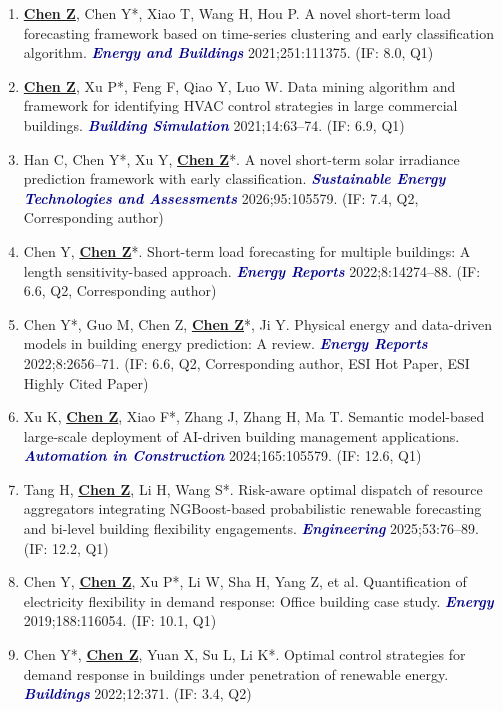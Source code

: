 \documentclass[11pt,a4paper]{article}
\newcommand{\me}[1]{\underline{\textbf{#1}}}
\newcommand{\journal}[1]{\textcolor{darkblue}{\textbf{\textit{#1}}}}
\begin{document}
\begin{enumerate}[itemsep=1pt]
\item \me{Chen Z}, Chen Y*, Xiao T, Wang H, Hou P. A novel short-term load forecasting framework based on time-series clustering and early classification algorithm. \journal{Energy and Buildings} 2021;251:111375. (IF: 8.0, Q1)

\item \me{Chen Z}, Xu P*, Feng F, Qiao Y, Luo W. Data mining algorithm and framework for identifying HVAC control strategies in large commercial buildings. \journal{Building Simulation} 2021;14:63--74. (IF: 6.9, Q1)

\item Han C, Chen Y*, Xu Y, \me{Chen Z}*. A novel short-term solar irradiance prediction framework with early classification. \journal{Sustainable Energy Technologies and Assessments} 2026;95:105579. (IF: 7.4, Q2, Corresponding author)

\item Chen Y, \me{Chen Z}*. Short-term load forecasting for multiple buildings: A length sensitivity-based approach. \journal{Energy Reports} 2022;8:14274--88. (IF: 6.6, Q2, Corresponding author)

\item Chen Y*, Guo M, Chen Z, \me{Chen Z}*, Ji Y. Physical energy and data-driven models in building energy prediction: A review. \journal{Energy Reports} 2022;8:2656--71. (IF: 6.6, Q2, Corresponding author, ESI Hot Paper, ESI Highly Cited Paper)

\item Xu K, \me{Chen Z}, Xiao F*, Zhang J, Zhang H, Ma T. Semantic model-based large-scale deployment of AI-driven building management applications. \journal{Automation in Construction} 2024;165:105579. (IF: 12.6, Q1)

\item Tang H, \me{Chen Z}, Li H, Wang S*. Risk-aware optimal dispatch of resource aggregators integrating NGBoost-based probabilistic renewable forecasting and bi-level building flexibility engagements. \journal{Engineering} 2025;53:76--89. (IF: 12.2, Q1)

\item Chen Y, \me{Chen Z}, Xu P*, Li W, Sha H, Yang Z, et al. Quantification of electricity flexibility in demand response: Office building case study. \journal{Energy} 2019;188:116054. (IF: 10.1, Q1)

\item Chen Y*, \me{Chen Z}, Yuan X, Su L, Li K*. Optimal control strategies for demand response in buildings under penetration of renewable energy. \journal{Buildings} 2022;12:371. (IF: 3.4, Q2)


\end{enumerate}
\end{document}

